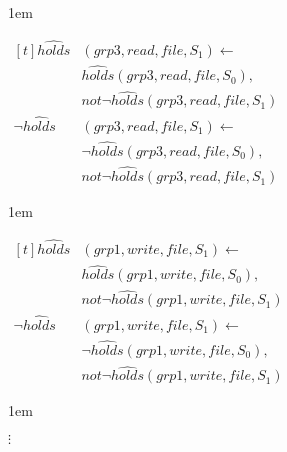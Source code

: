 \documentclass[global,twocolumn,final]{svjour}
\newenvironment{vexample}
  {\begin{example}\hspace{0.25em}}
  {\end{example}}
\newenvironment{vquote}
  {\begin{list}{}{\leftmargin 1em}\item[]}
  {\end{list}}
\begin{document}
\begin{vexample}
\begin{enumerate}
              \begin{vquote}
                \begin{math}
                  \begin{aligned}[t]
                    \hat{holds}&(grp3, read, file, S_{1}) \leftarrow \\
                    & \hat{holds}(grp3, read, file, S_{0}), \\
                    & not \lnot \hat{holds}(grp3, read, file, S_{1}) \\
                    \lnot \hat{holds}&(grp3, read, file, S_{1}) \leftarrow \\
                    & \lnot \hat{holds}(grp3, read, file, S_{0}), \\
                    & not \lnot \hat{holds}(grp3, read, file, S_{1})
                  \end{aligned}
                \end{math}
              \end{vquote}

              \begin{vquote}
                \begin{math}
                  \begin{aligned}[t]
                    \hat{holds}&(grp1, write, file, S_{1}) \leftarrow \\
                    & \hat{holds}(grp1, write, file, S_{0}), \\
                    & not \lnot \hat{holds}(grp1, write, file, S_{1}) \\
                    \lnot \hat{holds}&(grp1, write, file, S_{1}) \leftarrow \\
                    & \lnot \hat{holds}(grp1, write, file, S_{0}), \\
                    & not \lnot \hat{holds}(grp1, write, file, S_{1})
                  \end{aligned}
                \end{math}
              \end{vquote}

              \begin{vquote}
                \hspace{5em}$\vdots$
              \end{vquote}


\end{enumerate}
\end{vexample}
\end{document}
